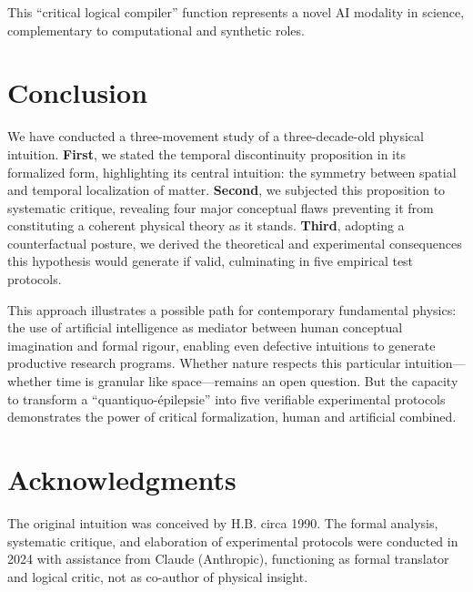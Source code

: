 \documentclass[11pt,a4paper]{article}
\begin{document}
This ``critical logical compiler'' function represents a novel AI modality in science, complementary to computational and synthetic roles.

\section*{Conclusion}

We have conducted a three-movement study of a three-decade-old physical intuition. \textbf{First}, we stated the temporal discontinuity proposition in its formalized form, highlighting its central intuition: the symmetry between spatial and temporal localization of matter. \textbf{Second}, we subjected this proposition to systematic critique, revealing four major conceptual flaws preventing it from constituting a coherent physical theory as it stands. \textbf{Third}, adopting a counterfactual posture, we derived the theoretical and experimental consequences this hypothesis would generate if valid, culminating in five empirical test protocols.

This approach illustrates a possible path for contemporary fundamental physics: the use of artificial intelligence as mediator between human conceptual imagination and formal rigour, enabling even defective intuitions to generate productive research programs. Whether nature respects this particular intuition---whether time is granular like space---remains an open question. But the capacity to transform a ``quantiquo-épilepsie'' into five verifiable experimental protocols demonstrates the power of critical formalization, human and artificial combined.

\section*{Acknowledgments}

The original intuition was conceived by H.B. circa 1990. The formal analysis, systematic critique, and elaboration of experimental protocols were conducted in 2024 with assistance from Claude (Anthropic), functioning as formal translator and logical critic, not as co-author of physical insight.
\end{document}
